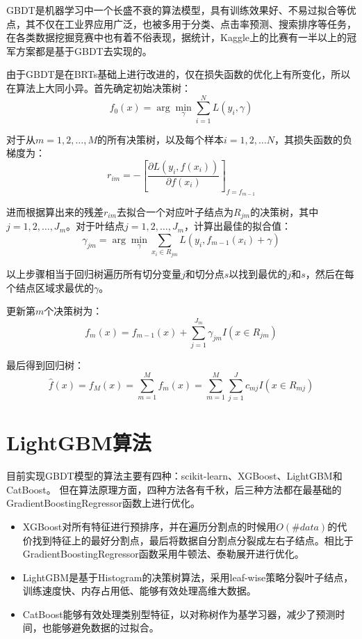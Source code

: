 GBDT是机器学习中一个长盛不衰的算法模型，具有训练效果好、不易过拟合等优点，其不仅在工业界应用广泛，也被多用于分类、点击率预测、搜索排序等任务，在各类数据挖掘竞赛中也有着不俗表现，据统计，Kaggle上的比赛有一半以上的冠军方案都是基于GBDT去实现的\cite{microstrongShenRuLiJieLightGBM2020}。

由于GBDT是在BRTs基础上进行改进的，仅在损失函数的优化上有所变化，所以在算法上大同小异。首先确定初始决策树：
$$f_{0}(x)=\arg \min _{\gamma} \sum_{i=1}^{N} L\left(y_{i}, \gamma\right)$$

对于从$m=1, 2, \ldots, M$的所有决策树，以及每个样本$i=1, 2, \ldots N$，其损失函数的负梯度为：
$$
r_{i m}=-\left[\frac{\partial L\left(y_{i}, f\left(x_{i}\right)\right)}{\partial f\left(x_{i}\right)}\right]_{f=f_{m-1}}
$$

进而根据算出来的残差$r_{i m}$去拟合一个对应叶子结点为$R_{j m}$的决策树，其中$j=1,2, \ldots, J_{m}$。对于叶结点$j=1,2, \ldots, J_{m}$，计算出最佳的拟合值：
$$
\gamma_{j m}=\arg \min _{\gamma} \sum_{x_{i} \in R_{j m}} L\left(y_{i}, f_{m-1}\left(x_{i}\right)+\gamma\right)
$$

以上步骤相当于回归树遍历所有切分变量$j$和切分点$s$以找到最优的$j$和$s$，然后在每个结点区域求最优的$\gamma$。

更新第$m$个决策树为：
$$f_{m}(x)=f_{m-1}(x)+\sum_{j=1}^{J_{m}} \gamma_{j m} I\left(x \in R_{j m}\right)$$

最后得到回归树：
$$
\hat{f}(x)=f_{M}(x)=\sum_{m=1}^{M} f_{m}(x)=\sum_{m=1}^{M} \sum_{j=1}^{J} c_{m j} I\left(x \in R_{m j}\right)
$$

\section{LightGBM算法}
目前实现GBDT模型的算法主要有四种：scikit-learn、XGBoost、LightGBM和CatBoost。
但在算法原理方面，四种方法各有千秋，后三种方法都在最基础的GradientBoostingRegressor函数上进行优化。
\begin{itemize}
\item XGBoost对所有特征进行预排序，并在遍历分割点的时候用$O(\#data)$的代价找到特征上的最好分割点，最后将数据自分割点分裂成左右子结点。相比于GradientBoostingRegressor函数采用牛顿法、泰勒展开进行优化\cite{OptimizationXGBoostLoss}。
\item LightGBM是基于Histogram的决策树算法，采用leaf-wise策略分裂叶子结点，训练速度快、内存占用低、能够有效处理高维大数据。
\item CatBoost能够有效处理类别型特征，以对称树作为基学习器，减少了预测时间，也能够避免数据的过拟合。
\end{itemize}


